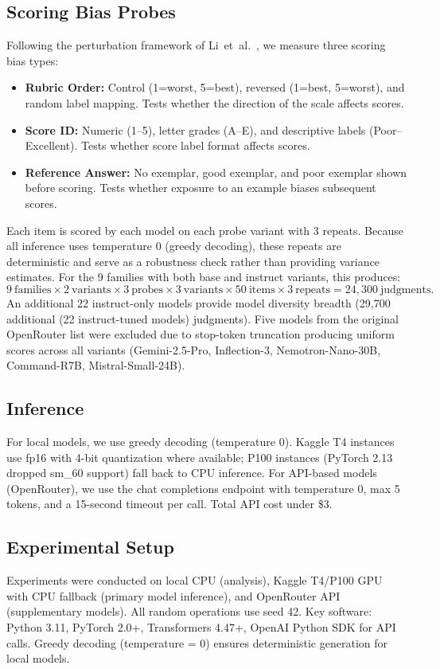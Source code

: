 \documentclass[11pt,twocolumn]{article}
\begin{document}
\subsection{Scoring Bias Probes}
Following the perturbation framework of Li~et~al.~\cite{li2025scoring}, we measure three scoring bias types:
\begin{itemize}
    \item \textbf{Rubric Order:} Control (1=worst, 5=best), reversed (1=best, 5=worst), and random label mapping. Tests whether the direction of the scale affects scores.
    \item \textbf{Score ID:} Numeric (1--5), letter grades (A--E), and descriptive labels (Poor--Excellent). Tests whether score label format affects scores.
    \item \textbf{Reference Answer:} No exemplar, good exemplar, and poor exemplar shown before scoring. Tests whether exposure to an example biases subsequent scores.
\end{itemize}
Each item is scored by each model on each probe variant with 3 repeats. Because all inference uses temperature 0 (greedy decoding), these repeats are deterministic and serve as a robustness check rather than providing variance estimates. For the 9 families with both base and instruct variants, this produces:
\[
9~\text{families} \times 2~\text{variants} \times 3~\text{probes} \times 3~\text{variants} \times 50~\text{items} \times 3~\text{repeats} = 24,300~\text{judgments}.
\]
An additional 22 instruct-only models provide model diversity breadth (29,700 additional (22 instruct-tuned models) judgments). Five models from the original OpenRouter list were excluded due to stop-token truncation producing uniform scores across all variants (Gemini-2.5-Pro, Inflection-3, Nemotron-Nano-30B, Command-R7B, Mistral-Small-24B).

\subsection{Inference}
For local models, we use greedy decoding (temperature 0). Kaggle T4 instances use fp16 with 4-bit quantization where available; P100 instances (PyTorch 2.13 dropped sm_60 support) fall back to CPU inference. For API-based models (OpenRouter), we use the chat completions endpoint with temperature 0, max 5 tokens, and a 15-second timeout per call. Total API cost under \$3.

\subsection{Experimental Setup}
Experiments were conducted on local CPU (analysis), Kaggle T4/P100 GPU with CPU fallback (primary model inference), and OpenRouter API (supplementary models). All random operations use seed 42. Key software: Python 3.11, PyTorch 2.0+, Transformers 4.47+, OpenAI Python SDK for API calls. Greedy decoding (temperature = 0) ensures deterministic generation for local models.
\end{document}
